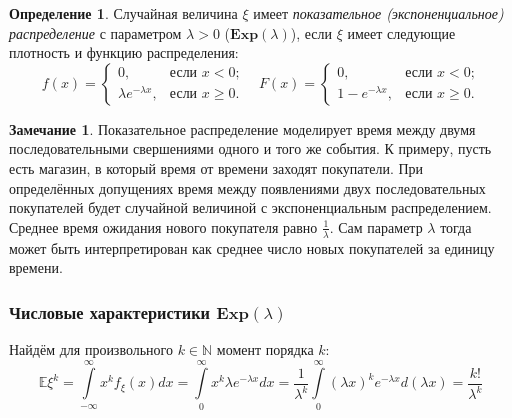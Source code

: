 \documentclass[oneside,final,14pt]{extreport}
\theoremstyle{plain}
\theoremstyle{definition}
\newtheorem*{defn}{Определение}
\newtheorem*{rmrk}{Замечание}
\theoremstyle{named}
\begin{document}
\begin{defn}
    Случайная величина $\xi$ имеет {\it показательное (экспоненциальное) распределение} с параметром $\lambda > 0$ ($\mathbf{Exp}(\lambda)$), если $\xi$ имеет следующие плотность и функцию распределения:
    \begin{equation*}
        f(x) = 
        \begin{cases}
            0, & \text{если $x < 0$;} \\
            \lambda e^{-\lambda x}, & \text{если $x \geqslant 0$.}
        \end{cases}
        \quad 
        F(x) = 
        \begin{cases}
            0, & \text{если $x < 0$;} \\
            1 - e^{-\lambda x}, & \text{если $x \geqslant 0$.}
        \end{cases}
    \end{equation*}
\end{defn}

\begin{rmrk}
    Показательное распределение моделирует время между двумя последовательными свершениями одного и того же события. К примеру, пусть есть магазин, в который время от времени заходят покупатели. При определённых допущениях время между появлениями двух последовательных покупателей будет случайной величиной с экспоненциальным распределением. Среднее время ожидания нового покупателя равно $\frac{1}{\lambda}$. Сам параметр $\lambda$ тогда может быть интерпретирован как среднее число новых покупателей за единицу времени. 
\end{rmrk}

\subsubsection{Числовые характеристики $\mathbf{Exp}(\lambda)$}

Найдём для произвольного $k \in \mathbb{N}$ момент порядка $k$:
\begin{equation*}
    \mathbb{E} \xi^{k}=\int\limits_{-\infty}^{\infty} x^{k} f_{\xi}(x) d x=\int\limits_{0}^{\infty} x^{k} \lambda e^{-\lambda x} d x=\frac{1}{\lambda^{k}} \int\limits_{0}^{\infty}(\lambda x)^{k} e^{-\lambda x} d(\lambda x)=\frac{k !}{\lambda^{k}}
\end{equation*}
\end{document}
